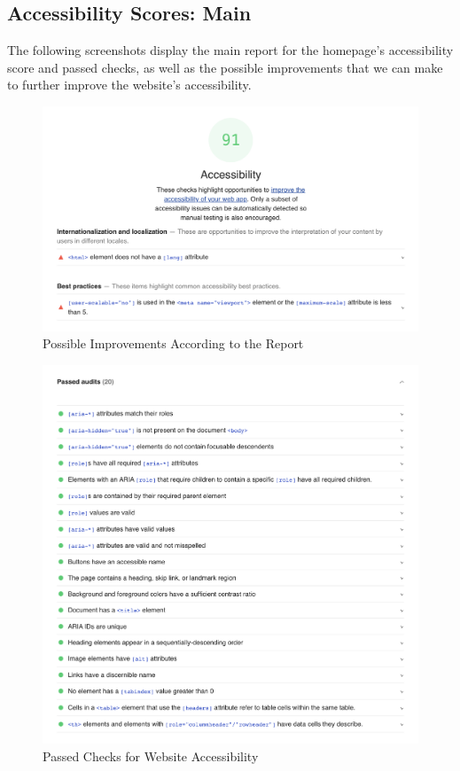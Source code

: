 \documentclass[12pt, letterpaper]{article}
\begin{document}
 \newpage


\subsection*{Accessibility Scores: Main}
The following screenshots display the main report for the homepage's accessibility score and passed checks, as well as the possible improvements that we can make to further improve the website's accessibility.

\begin{figure}[htbp]
	\centering
	\includegraphics[width=\textwidth]{images/26-score-index.png}
	\caption{Possible Improvements According to the Report}
 \end{figure}

 \begin{figure}[htbp]
	\centering
	\includegraphics[width=\textwidth]{images/26-passed-index.png}
	\caption{Passed Checks for Website Accessibility}
 \end{figure}
\end{document}

